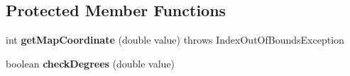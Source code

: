 \subsection*{Protected Member Functions}
\begin{DoxyCompactItemize}
\item 
\mbox{\label{classcom_1_1verify_1_1_nearest_points_af568d2e2106e5d2e47bc3f06aa0183bc}} 
int {\bfseries get\+Map\+Coordinate} (double value)  throws Index\+Out\+Of\+Bounds\+Exception 
\item 
\mbox{\label{classcom_1_1verify_1_1_nearest_points_a108714a02fead442c986fb0fb8f273d3}} 
boolean {\bfseries check\+Degrees} (double value)
\end{DoxyCompactItemize}
